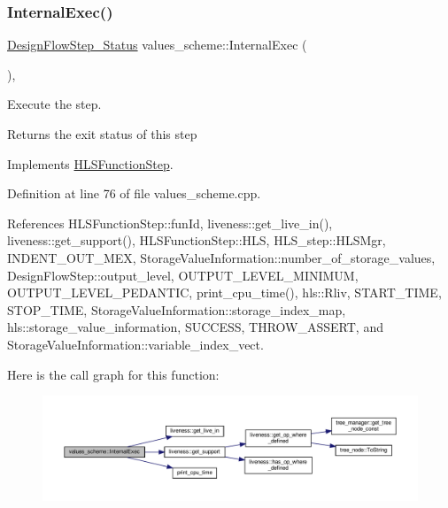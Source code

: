 \subsubsection{\texorpdfstring{Internal\+Exec()}{InternalExec()}}
{\footnotesize\ttfamily \hyperlink{design__flow__step_8hpp_afb1f0d73069c26076b8d31dbc8ebecdf}{Design\+Flow\+Step\+\_\+\+Status} values\+\_\+scheme\+::\+Internal\+Exec (\begin{DoxyParamCaption}{ }\end{DoxyParamCaption})\hspace{0.3cm}{\ttfamily [override]}, {\ttfamily [virtual]}}



Execute the step. 

\begin{DoxyReturn}{Returns}
the exit status of this step 
\end{DoxyReturn}


Implements \hyperlink{classHLSFunctionStep_a8db4c00d080655984d98143206fc9fa8}{H\+L\+S\+Function\+Step}.



Definition at line 76 of file values\+\_\+scheme.\+cpp.



References H\+L\+S\+Function\+Step\+::fun\+Id, liveness\+::get\+\_\+live\+\_\+in(), liveness\+::get\+\_\+support(), H\+L\+S\+Function\+Step\+::\+H\+LS, H\+L\+S\+\_\+step\+::\+H\+L\+S\+Mgr, I\+N\+D\+E\+N\+T\+\_\+\+O\+U\+T\+\_\+\+M\+EX, Storage\+Value\+Information\+::number\+\_\+of\+\_\+storage\+\_\+values, Design\+Flow\+Step\+::output\+\_\+level, O\+U\+T\+P\+U\+T\+\_\+\+L\+E\+V\+E\+L\+\_\+\+M\+I\+N\+I\+M\+UM, O\+U\+T\+P\+U\+T\+\_\+\+L\+E\+V\+E\+L\+\_\+\+P\+E\+D\+A\+N\+T\+IC, print\+\_\+cpu\+\_\+time(), hls\+::\+Rliv, S\+T\+A\+R\+T\+\_\+\+T\+I\+ME, S\+T\+O\+P\+\_\+\+T\+I\+ME, Storage\+Value\+Information\+::storage\+\_\+index\+\_\+map, hls\+::storage\+\_\+value\+\_\+information, S\+U\+C\+C\+E\+SS, T\+H\+R\+O\+W\+\_\+\+A\+S\+S\+E\+RT, and Storage\+Value\+Information\+::variable\+\_\+index\+\_\+vect.

Here is the call graph for this function\+:
\nopagebreak
\begin{figure}[H]
\begin{center}
\leavevmode
\includegraphics[width=350pt]{dc/d08/classvalues__scheme_a50f8ae25513ed41d826c56758af143c3_cgraph}
\end{center}
\end{figure}


